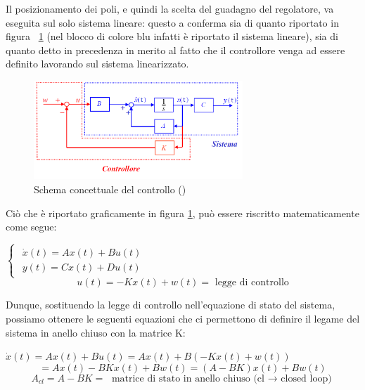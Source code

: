 Il posizionamento dei poli, e quindi la scelta del guadagno del regolatore, va eseguita sul solo sistema lineare: questo a conferma sia di quanto riportato in figura ~\ref{fig:feedback_state} (nel blocco di colore blu infatti è riportato il sistema lineare), sia di quanto detto in precedenza in merito al fatto che il controllore venga ad essere definito lavorando sul sistema linearizzato.

\begin{figure}[H]
	\centering   	
	\includegraphics[width=0.70\textwidth]{Immagini/feedback_state.png}
	\caption{Schema concettuale del controllo (\cite{feedback_state})}
	\label{fig:feedback_state}
\end{figure}

Ciò che è riportato graficamente in figura \ref{fig:feedback_state}, può essere riscritto matematicamente come segue:
\begin{center}
	$
	\begin{cases}
	\begin{array}{c}
	\dot{x}\left(t\right)=Ax{\left(t\right)}+Bu\left(t\right)\\
	y{\left(t\right)}=Cx{\left(t\right)}+Du\left(t\right)
	\end{array}
	\end{cases}
	$
	$$
	u{\left(t\right)}=-Kx{\left(t\right)}+w{\left(t\right)}	= \text{ legge di controllo}
	$$
\end{center}

Dunque, sostituendo la legge di controllo nell'equazione di stato del sistema, possiamo ottenere le seguenti equazioni che ci permettono di definire il legame del sistema in anello chiuso con la matrice K:
\begin{center}
	$
	\dot{x}{\left(t\right)}=Ax{\left(t\right)}+Bu{\left(t\right)}=Ax{\left(t\right)}+B{\left(-Kx{\left(t\right)}+w{\left(t\right)}\right)}
	$
	$$
	=Ax{\left(t\right)}-BKx{\left(t\right)}+Bw\left(t\right)={\left(A-BK\right)}x{\left(t\right)}+Bw{\left(t\right)}
	$$
	$$
	A_{cl} =A-BK = \text{ matrice di stato in anello chiuso (cl $\rightarrow$ closed loop)}
	$$
\end{center}

